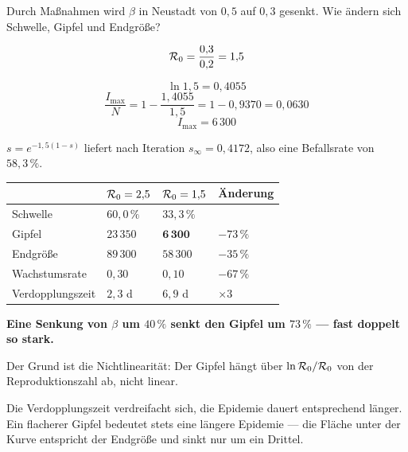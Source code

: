 \begin{aufgabe}
Durch Maßnahmen wird $\beta$ in Neustadt von $0{,}5$ auf $0{,}3$ gesenkt. Wie ändern sich Schwelle, Gipfel und Endgröße?

\loesung
{}
\[ \mathcal{R}_0 = \frac{0{,}3}{0{,}2} = 1{,}5 \]

\[ \ln 1{,}5 = 0{,}4055 \]
\[ \frac{I_{\max}}{N} = 1 - \frac{1{,}4055}{1{,}5} = 1 - 0{,}9370 = 0{,}0630 \]
\[ I_{\max} = 6\,300 \]

$s = e^{-1{,}5(1-s)}$ liefert nach Iteration $s_\infty = 0{,}4172$, also eine Befallsrate von $58{,}3\,\%$.

\begin{center}
{\small
\renewcommand{\arraystretch}{1.48}
\begin{tabular}{@{}P{2.6cm}P{1.8cm}P{1.8cm}P{1.8cm}@{}}
\toprule
& $\mathcal{R}_0 = 2{,}5$ & $\mathcal{R}_0 = 1{,}5$ & \textbf{Änderung}\\
\midrule
Schwelle & $60{,}0\,\%$ & $33{,}3\,\%$ & \\
Gipfel & $23\,350$ & $\mathbf{6\,300}$ & $-73\,\%$\\
Endgröße & $89\,300$ & $58\,300$ & $-35\,\%$\\
Wachstumsrate & $0{,}30$ & $0{,}10$ & $-67\,\%$\\
Verdopplungs\-zeit & $2{,}3$ d & $6{,}9$ d & $\times 3$\\
\bottomrule
\end{tabular}}
\end{center}

\begin{center}
\begin{minipage}{0.9\textwidth}
\textbf{Eine Senkung von $\beta$ um $40\,\%$ senkt den Gipfel um $73\,\%$ --- fast doppelt so stark.}
\end{minipage}
\end{center}

Der Grund ist die Nichtlinearität: Der Gipfel hängt über $\ln\mathcal{R}_0/\mathcal{R}_0$ von der Reproduktionszahl ab, nicht linear.

\begin{center}
\begin{minipage}{0.88\textwidth}
\end{minipage}
\end{center}

Die Verdopplungszeit verdreifacht sich, die Epidemie dauert entsprechend länger. Ein flacherer Gipfel bedeutet stets eine längere Epidemie --- die Fläche unter der Kurve entspricht der Endgröße und sinkt nur um ein Drittel.
\end{aufgabe}


